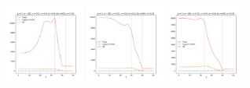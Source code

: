 \documentclass[a4paper]{article}
\begin{document}
\begin{figure}[H]
  \includegraphics[width=0.23\textwidth]{grid-g2-v6-w2_0}
  \includegraphics[width=0.23\textwidth]{grid-g2-v6-w3_0}
  \includegraphics[width=0.23\textwidth]{grid-g2-v6-w4_0}
\end{figure}
\end{document}
